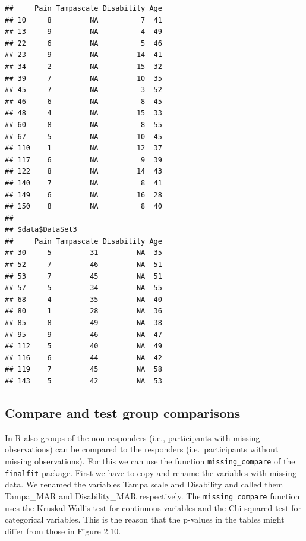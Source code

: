\documentclass[
]{book}
\begin{document}
\begin{verbatim}
##     Pain Tampascale Disability Age
## 10     8         NA          7  41
## 13     9         NA          4  49
## 22     6         NA          5  46
## 23     9         NA         14  41
## 34     2         NA         15  32
## 39     7         NA         10  35
## 45     7         NA          3  52
## 46     6         NA          8  45
## 48     4         NA         15  33
## 60     8         NA          8  55
## 67     5         NA         10  45
## 110    1         NA         12  37
## 117    6         NA          9  39
## 122    8         NA         14  43
## 140    7         NA          8  41
## 149    6         NA         16  28
## 150    8         NA          8  40
## 
## $data$DataSet3
##     Pain Tampascale Disability Age
## 30     5         31         NA  35
## 52     7         46         NA  51
## 53     7         45         NA  51
## 57     5         34         NA  55
## 68     4         35         NA  40
## 80     1         28         NA  36
## 85     8         49         NA  38
## 95     9         46         NA  47
## 112    5         40         NA  49
## 116    6         44         NA  42
## 119    7         45         NA  58
## 143    5         42         NA  53
\end{verbatim}

\hypertarget{compare-and-test-group-comparisons-1}{%
\subsection{Compare and test group
comparisons}\label{compare-and-test-group-comparisons-1}}

In R also groups of the non-responders (i.e., participants with missing
observations) can be compared to the responders (i.e.~participants
without missing observations). For this we can use the function
\texttt{missing\_compare} of the \texttt{finalfit} package. First we
have to copy and rename the variables with missing data. We renamed the
variables Tampa scale and Disability and called them Tampa\_MAR and
Disability\_MAR respectively. The \texttt{missing\_compare} function
uses the Kruskal Wallis test for continuous variables and the
Chi-squared test for categorical variables. This is the reason that the
p-values in the tables might differ from those in Figure 2.10.
\end{document}
